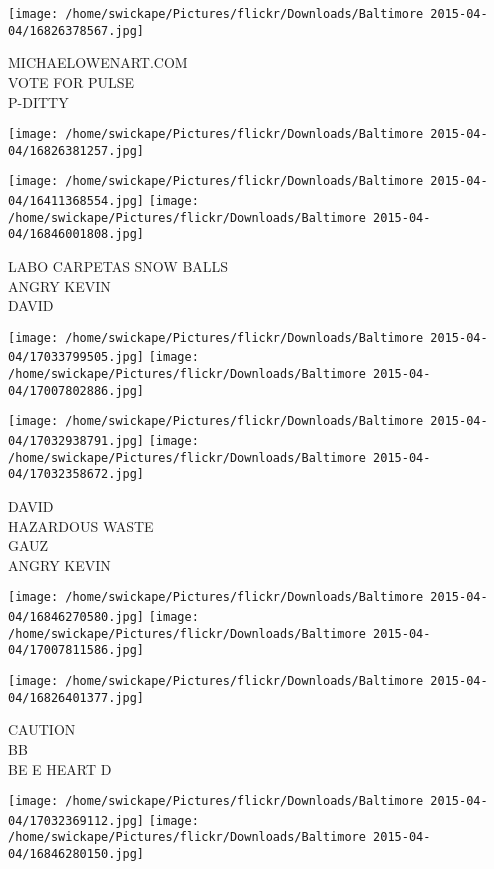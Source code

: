 \documentclass[10pt,letterpaper]{article}
\begin{document}
\vspace{0.25in}
\texttt{[image: /home/swickape/Pictures/flickr/Downloads/Baltimore 2015-04-04/16826378567.jpg]}

MICHAELOWENART.COM\\
VOTE FOR PULSE\\
P{-}DITTY\\
\pagebreak

\texttt{[image: /home/swickape/Pictures/flickr/Downloads/Baltimore 2015-04-04/16826381257.jpg]}

\vspace{0.25in}
\texttt{[image: /home/swickape/Pictures/flickr/Downloads/Baltimore 2015-04-04/16411368554.jpg]}
\texttt{[image: /home/swickape/Pictures/flickr/Downloads/Baltimore 2015-04-04/16846001808.jpg]}

LABO CARPETAS SNOW BALLS\\
ANGRY KEVIN\\
DAVID\\
\pagebreak

\texttt{[image: /home/swickape/Pictures/flickr/Downloads/Baltimore 2015-04-04/17033799505.jpg]}
\texttt{[image: /home/swickape/Pictures/flickr/Downloads/Baltimore 2015-04-04/17007802886.jpg]}

\texttt{[image: /home/swickape/Pictures/flickr/Downloads/Baltimore 2015-04-04/17032938791.jpg]}
\texttt{[image: /home/swickape/Pictures/flickr/Downloads/Baltimore 2015-04-04/17032358672.jpg]}

DAVID\\
HAZARDOUS WASTE\\
GAUZ\\
ANGRY KEVIN\\
\pagebreak

\texttt{[image: /home/swickape/Pictures/flickr/Downloads/Baltimore 2015-04-04/16846270580.jpg]}
\texttt{[image: /home/swickape/Pictures/flickr/Downloads/Baltimore 2015-04-04/17007811586.jpg]}

\vspace{0.25in}
\texttt{[image: /home/swickape/Pictures/flickr/Downloads/Baltimore 2015-04-04/16826401377.jpg]}

CAUTION\\
BB\\
BE E HEART D\\
\pagebreak

\texttt{[image: /home/swickape/Pictures/flickr/Downloads/Baltimore 2015-04-04/17032369112.jpg]}
\texttt{[image: /home/swickape/Pictures/flickr/Downloads/Baltimore 2015-04-04/16846280150.jpg]}
\end{document}
